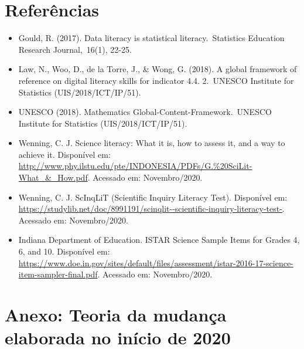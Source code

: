 \documentclass[
]{book}
\providecommand{\tightlist}{%
  \setlength{\itemsep}{0pt}\setlength{\parskip}{0pt}}
\begin{document}
\hypertarget{referuxeancias}{%
\section{Referências}\label{referuxeancias}}

\begin{itemize}
\tightlist
\item
  Gould, R. (2017). Data literacy is statistical literacy.~Statistics Education Research Journal,~16(1), 22-25.
\item
  Law, N., Woo, D., de la Torre, J., \& Wong, G. (2018). A global framework of reference on digital literacy skills for indicator 4.4. 2.~UNESCO Institute for Statistics (UIS/2018/ICT/IP/51).
\item
  UNESCO (2018). Mathematics Global-Content-Framework.~UNESCO Institute for Statistics (UIS/2018/ICT/IP/51).
\item
  Wenning, C. J. Science literacy: What it is, how to assess it, and a way to achieve it. Disponível em: \url{http://www.phy.ilstu.edu/pte/INDONESIA/PDFs/G.\%20SciLit-What_\&_How.pdf}. Acessado em: Novembro/2020.
\item
  Wenning, C. J. ScInqLiT (Scientific Inquiry Literacy Test). Disponível em: \url{https://studylib.net/doc/8991191/scinqlit--scientific-inquiry-literacy-test-}. Acessado em: Novembro/2020.
\item
  Indiana Department of Education. ISTAR Science Sample Items for Grades 4, 6, and 10. Disponível em: \url{https://www.doe.in.gov/sites/default/files/assessment/istar-2016-17-science-item-sampler-final.pdf}. Acessado em: Novembro/2020.
\end{itemize}

\hypertarget{anexo-teoria-da-mudanuxe7a-elaborada-no-inuxedcio-de-2020}{%
\section*{Anexo: Teoria da mudança elaborada no início de 2020}\label{anexo-teoria-da-mudanuxe7a-elaborada-no-inuxedcio-de-2020}}
\end{document}
